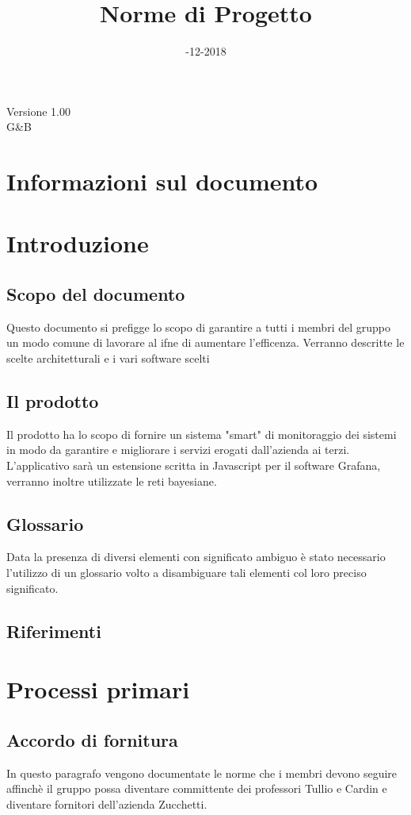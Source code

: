 \documentclass[a4paper,12pt]{article}
\title{\myfont Norme di Progetto}
\date{\myfont 04-12-2018}
\begin{document}
  \maketitle
  \begin{center}
  \huge Versione 1.00 
  \\G\&B
  \end{center}
  \newpage
  \tableofcontents
  \newpage

\section*{Informazioni sul documento}


\section{Introduzione}
\subsection{Scopo del documento}
Questo documento si prefigge lo scopo di garantire a tutti i membri del gruppo un modo comune di lavorare al ifne di aumentare l'efficenza. Verranno descritte le scelte architetturali e i vari software scelti
\subsection{Il prodotto}
Il prodotto ha lo scopo di fornire un sistema "smart" di monitoraggio dei sistemi in modo da garantire e migliorare i servizi erogati dall'azienda ai terzi. L'applicativo sarà un estensione scritta in Javascript per il software Grafana, verranno inoltre utilizzate le reti bayesiane.
\subsection{Glossario}
Data la presenza di diversi elementi con significato ambiguo è stato necessario l'utilizzo di un glossario volto a disambiguare tali elementi col loro preciso significato.
\subsection{Riferimenti}

\newpage

\section{Processi primari}
\subsection{Accordo di fornitura}
In questo paragrafo vengono documentate le norme che i membri devono seguire affinchè il gruppo possa diventare committente dei professori Tullio e Cardin e diventare fornitori dell'azienda Zucchetti.
\end{document}
